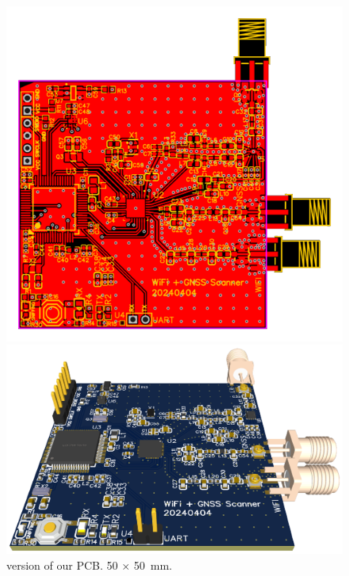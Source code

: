 \begin{figure}[H]
    \centering
    \begin{minipage}[c]{0.49\textwidth}
        \centering
        \includegraphics[width=\textwidth]{figures/PCB_v2.png}
    \end{minipage}
    \hfill
    \begin{minipage}[c]{0.49\textwidth}
        \centering
        \includegraphics[width=\textwidth]{figures/PCB_v2_3D.png}
    \end{minipage}
    \caption{ version of our PCB. \si{50} $\times$ \SI{50}{\milli\meter}.}
    \label{fig:pcb_v2}
\end{figure}

